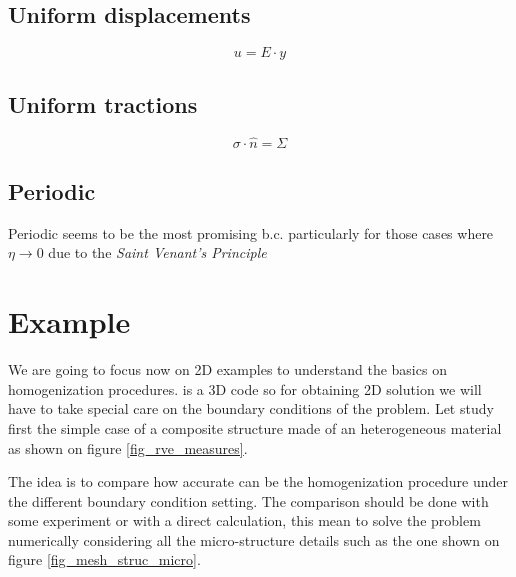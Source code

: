 \subsection{Uniform displacements}
\begin{equation}
u = E \cdot y
\end{equation}

\subsection{Uniform tractions}
\begin{equation}
\sigma \cdot \hat{n} = \Sigma
\end{equation}

\subsection{Periodic}
Periodic seems to be the most promising b.c. particularly for those cases where $\eta \rightarrow 0$ 
due to the \emph{Saint Venant's Principle}

\section{Example}

We are going to focus now on 2D examples to understand the basics on homogenization procedures. \sputnik is 
a 3D code so for obtaining 2D solution we will have to take special care on the boundary conditions of the 
problem.
Let study first the simple case of a composite structure made of an heterogeneous material as shown on figure
\ref{fig_rve_measures}.

The idea is to compare how accurate can be the homogenization procedure under the different boundary 
condition setting. The comparison should be done with some experiment or with a direct calculation, 
this mean to solve the problem numerically considering all the micro-structure details such as the 
one shown on figure \ref{fig_mesh_struc_micro}. 

